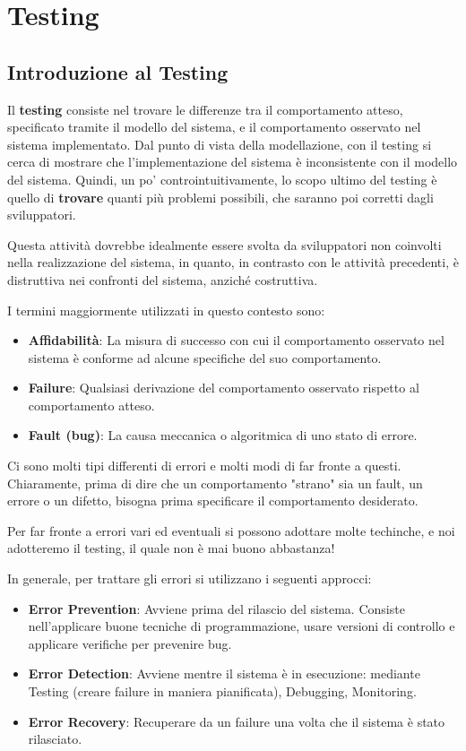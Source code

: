 \chapter{Testing}
    \section{Introduzione al Testing}
        Il \textbf{testing} consiste nel trovare le differenze tra il comportamento atteso, specificato tramite il modello del sistema, e il comportamento osservato nel sistema implementato. Dal punto di vista della modellazione, con il testing si cerca di mostrare che l'implementazione del sistema è inconsistente con il modello del sistema. Quindi, un po' controintuitivamente, lo scopo ultimo del testing è quello di \textbf{trovare} quanti più problemi possibili, che saranno poi corretti dagli sviluppatori.
        
        Questa attività dovrebbe idealmente essere svolta da sviluppatori non coinvolti nella realizzazione del sistema, in quanto, in contrasto con le attività precedenti, è distruttiva nei confronti del sistema, anziché costruttiva.
        
        \vspace{1mm}
        I termini maggiormente utilizzati in questo contesto sono:
        \begin{itemize}
            \item \textbf{Affidabilità}: La misura di successo con cui il comportamento osservato nel sistema è conforme ad alcune specifiche del suo comportamento.
            \item \textbf{Failure}: Qualsiasi derivazione del comportamento osservato rispetto al comportamento atteso.
            \item \textbf{Fault (bug)}: La causa meccanica o algoritmica di uno stato di errore.
        \end{itemize}
        
        Ci sono molti tipi differenti di errori e molti modi di far fronte a questi. Chiaramente, prima di dire che un comportamento "strano" sia un fault, un errore o un difetto, bisogna prima specificare il comportamento desiderato.
        
        Per far fronte a errori vari ed eventuali si possono adottare molte techinche, e noi adotteremo il testing, il quale non è mai buono abbastanza!
        
        In generale, per trattare gli errori si utilizzano i seguenti approcci:
        \begin{itemize}
            \item \textbf{Error Prevention}: Avviene prima del rilascio del sistema. Consiste nell'applicare buone tecniche di programmazione, usare versioni di controllo e applicare verifiche per prevenire bug.
            \item \textbf{Error Detection}: Avviene mentre il sistema è in esecuzione: mediante Testing (creare failure in maniera pianificata), Debugging, Monitoring.
            \item \textbf{Error Recovery}: Recuperare da un failure una volta che il sistema è stato rilasciato.
        \end{itemize}
        
